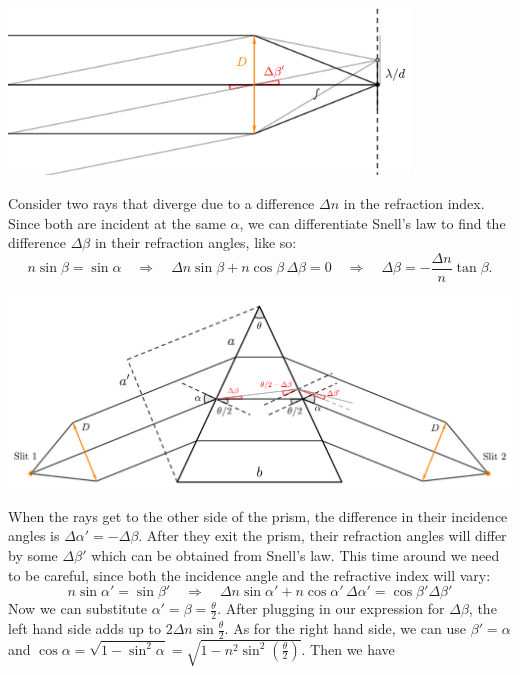 \documentclass[../TST.tex]{subfiles}
\begin{document}
\begin{solution}
		\begin{center}
		\includegraphics[width=0.8\textwidth]{fig/a2013_s61.pdf}
		\end{center}
		
Consider two rays that diverge due to a difference $\Delta n$ in the refraction index. Since both are incident at the same $\alpha$, we can differentiate Snell's law to find the difference $\Delta \beta$ in their refraction angles, like so:
\begin{equation*}
	n\sin\beta=\sin{\alpha} \quad\Rightarrow\quad \Delta n \sin\beta + n\cos\beta\,\Delta \beta=0 \quad\Rightarrow\quad \Delta \beta = - \frac{\Delta n}{n} \tan{\beta}
.
\end{equation*}
		\begin{center}
		\includegraphics[width=\textwidth]{fig/a2013_s62.pdf}
		\end{center}
When the rays get to the other side of the prism, the difference in their incidence angles is $\Delta \alpha ' =-\Delta \beta$. After they exit the prism, their refraction angles will differ by some $\Delta \beta'$ which can be obtained from Snell's law. This time around we need to be careful, since both the incidence angle and the refractive index will vary:
\begin{equation*}
	n\sin\alpha'=\sin{\beta'} \quad\Rightarrow\quad \Delta n \sin\alpha' + n\cos\alpha'\,\Delta \alpha'=\cos{\beta'}\Delta \beta'
\end{equation*}
Now we can substitute $\alpha'= \beta = \frac{\theta}{2}$. After plugging in our expression for $\Delta\beta$, the left hand side adds up to $2\Delta n \sin{\frac{\theta}{2}}$. As for the right hand side, we can use $\beta'=\alpha$ and $\cos{\alpha}=\sqrt{1-\sin^2{\alpha}}=\sqrt{1-n^2\sin^2\left(\frac{\theta}{2}\right)}$. Then we have

\end{solution}
\end{document}

